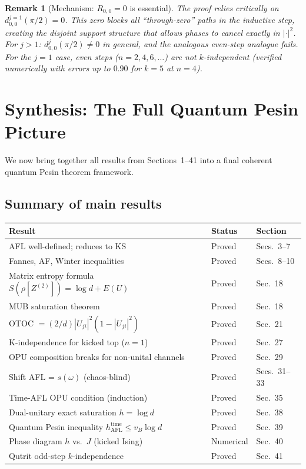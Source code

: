 \documentclass[12pt,a4paper]{article}
\newtheorem{remark}[theorem]{Remark}
\begin{document}
\begin{remark}[Mechanism: $R_{0,0}=0$ is essential]
The proof relies critically on $d^{j=1}_{0,0}(\pi/2)=0$.  This zero
blocks all ``through-zero'' paths in the inductive step, creating the
disjoint support structure that allows phases to cancel exactly in
$|\cdot|^2$.  For $j>1$: $d^j_{0,0}(\pi/2)\neq 0$ in general, and
the analogous even-step analogue fails.  For the $j=1$ case, even
steps ($n=2,4,6,\ldots$) are \emph{not} $k$-independent (verified
numerically with errors up to $0.90$ for $k=5$ at $n=4$).
\end{remark}

\section{Synthesis: The Full Quantum Pesin Picture}
\label{sec:synthesis_pesin}

We now bring together all results from Sections~1--41 into a final
coherent quantum Pesin theorem framework.

\subsection{Summary of main results}

\begin{center}
\renewcommand{\arraystretch}{1.35}
\begin{tabular}{lll}
\hline
\textbf{Result} & \textbf{Status} & \textbf{Section} \\
\hline
AFL well-defined; reduces to KS & Proved & Secs.~3--7 \\
Fannes, AF, Winter inequalities & Proved & Secs.~8--10 \\
Matrix entropy formula $S(\rho[Z^{(2)}])=\log d+E(U)$ & Proved & Sec.~18 \\
MUB saturation theorem & Proved & Sec.~18 \\
OTOC $= (2/d)|U_{ji}|^2(1-|U_{ji}|^2)$ & Proved & Sec.~21 \\
K-independence for kicked top ($n=1$) & Proved & Sec.~27 \\
OPU composition breaks for non-unital channels & Proved & Sec.~29 \\
Shift AFL = $s(\omega)$ (chaos-blind) & Proved & Secs.~31--33 \\
Time-AFL OPU condition (induction) & Proved & Sec.~35 \\
Dual-unitary exact saturation $h=\log d$ & Proved & Sec.~38 \\
Quantum Pesin inequality $h_{\mathrm{AFL}}^{\mathrm{time}}\leq v_B\log d$ & Proved & Sec.~39 \\
Phase diagram $h$ vs.\ $J$ (kicked Ising) & Numerical & Sec.~40 \\
Qutrit odd-step $k$-independence & Proved & Sec.~41 \\
\hline
\end{tabular}
\end{center}
\end{document}
